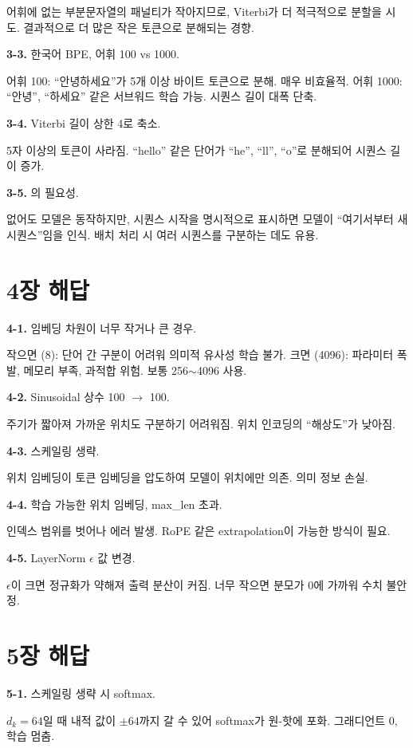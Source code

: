 어휘에 없는 부분문자열의 패널티가 작아지므로, Viterbi가 더 적극적으로 분할을 시도. 결과적으로 더 많은 작은 토큰으로 분해되는 경향.

\textbf{3-3.} 한국어 BPE, 어휘 100 vs 1000.

어휘 100: ``안녕하세요''가 5개 이상 바이트 토큰으로 분해. 매우 비효율적.
어휘 1000: ``안녕'', ``하세요'' 같은 서브워드 학습 가능. 시퀀스 길이 대폭 단축.

\textbf{3-4.} Viterbi 길이 상한 4로 축소.

5자 이상의 토큰이 사라짐. ``hello'' 같은 단어가 ``he'', ``ll'', ``o''로 분해되어 시퀀스 길이 증가.

\textbf{3-5.} 의 필요성.

없어도 모델은 동작하지만, 시퀀스 시작을 명시적으로 표시하면 모델이 ``여기서부터 새 시퀀스''임을 인식. 배치 처리 시 여러 시퀀스를 구분하는 데도 유용.

\section{4장 해답}

\textbf{4-1.} 임베딩 차원이 너무 작거나 큰 경우.

작으면 (8): 단어 간 구분이 어려워 의미적 유사성 학습 불가.
크면 (4096): 파라미터 폭발, 메모리 부족, 과적합 위험. 보통 256$\sim$4096 사용.

\textbf{4-2.} Sinusoidal 상수 100 $\to$ 100.

주기가 짧아져 가까운 위치도 구분하기 어려워짐. 위치 인코딩의 ``해상도''가 낮아짐.

\textbf{4-3.} 스케일링 생략.

위치 임베딩이 토큰 임베딩을 압도하여 모델이 위치에만 의존. 의미 정보 손실.

\textbf{4-4.} 학습 가능한 위치 임베딩, max\_len 초과.

인덱스 범위를 벗어나 에러 발생. RoPE 같은 extrapolation이 가능한 방식이 필요.

\textbf{4-5.} LayerNorm $\epsilon$ 값 변경.

$\epsilon$이 크면 정규화가 약해져 출력 분산이 커짐. 너무 작으면 분모가 0에 가까워 수치 불안정.

\section{5장 해답}

\textbf{5-1.} 스케일링 생략 시 softmax.

$d_k=64$일 때 내적 값이 $\pm 64$까지 갈 수 있어 softmax가 원-핫에 포화. 그래디언트 0, 학습 멈춤.

